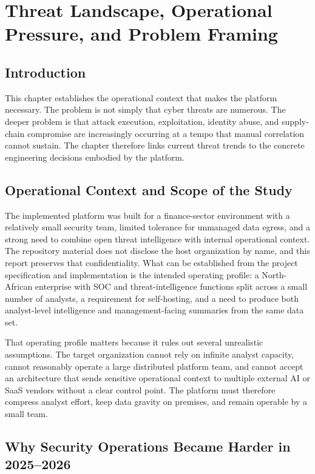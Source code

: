 \chapter{Threat Landscape, Operational Pressure, and Problem Framing}
\thispagestyle{plain}
\section*{Introduction}
This chapter establishes the operational context that makes the platform necessary. The problem is not simply that cyber threats are numerous. The deeper problem is that attack execution, exploitation, identity abuse, and supply-chain compromise are increasingly occurring at a tempo that manual correlation cannot sustain. The chapter therefore links current threat trends to the concrete engineering decisions embodied by the platform.

\section{Operational Context and Scope of the Study}
The implemented platform was built for a finance-sector environment with a relatively small security team, limited tolerance for unmanaged data egress, and a strong need to combine open threat intelligence with internal operational context. The repository material does not disclose the host organization by name, and this report preserves that confidentiality. What can be established from the project specification and implementation is the intended operating profile: a North-African enterprise with SOC and threat-intelligence functions split across a small number of analysts, a requirement for self-hosting, and a need to produce both analyst-level intelligence and management-facing summaries from the same data set.

That operating profile matters because it rules out several unrealistic assumptions. The target organization cannot rely on infinite analyst capacity, cannot reasonably operate a large distributed platform team, and cannot accept an architecture that sends sensitive operational context to multiple external AI or SaaS vendors without a clear control point. The platform must therefore compress analyst effort, keep data gravity on premises, and remain operable by a small team.

\section{Why Security Operations Became Harder in 2025--2026}
